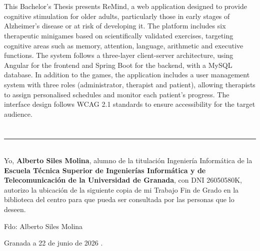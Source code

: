 \vspace{0.7cm}
\\

\vspace{0.7cm}
\\
This Bachelor's Thesis presents ReMind, a web application designed to provide cognitive stimulation for older adults, particularly those in early stages of Alzheimer's disease or at risk of developing it. The platform includes six therapeutic minigames based on scientifically validated exercises, targeting cognitive areas such as memory, attention, language, arithmetic and executive functions. The system follows a three-layer client-server architecture, using Angular for the frontend and Spring Boot for the backend, with a MySQL database. In addition to the games, the application includes a user management system with three roles (administrator, therapist and patient), allowing therapists to assign personalised schedules and monitor each patient's progress. The interface design follows WCAG 2.1 standards to ensure accessibility for the target audience.\\

\chapter*{}
\thispagestyle{empty}

\noindent\rule[-1ex]{\textwidth}{2pt}\\[4.5ex]

Yo, \textbf{Alberto Siles Molina}, alumno de la titulación Ingeniería Informática de la \textbf{Escuela Técnica Superior
de Ingenierías Informática y de Telecomunicación de la Universidad de Granada}, con DNI 26050580K, autorizo la
ubicación de la siguiente copia de mi Trabajo Fin de Grado en la biblioteca del centro para que pueda ser
consultada por las personas que lo deseen.

\vspace{6cm}

\noindent Fdo: Alberto Siles Molina

\vspace{2cm}

\begin{flushright}
Granada a 22 de junio de 2026 .
\end{flushright}


\chapter*{}
\thispagestyle{empty}

